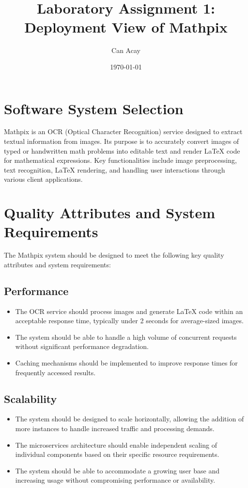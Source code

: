 \documentclass{article}
\title{Laboratory Assignment 1: Deployment View of Mathpix}
\author{Can Acay}
\date{\today}
\begin{document}
\maketitle
\newpage

\tableofcontents
\newpage

\section{Software System Selection}
Mathpix is an OCR (Optical Character Recognition) service designed to extract textual information from images. Its purpose is to accurately convert images of typed or handwritten math problems into editable text and render LaTeX code for mathematical expressions. Key functionalities include image preprocessing, text recognition, LaTeX rendering, and handling user interactions through various client applications.

\section{Quality Attributes and System Requirements}
The Mathpix system should be designed to meet the following key quality attributes and system requirements:

\subsection{Performance}
\begin{itemize}
\item The OCR service should process images and generate LaTeX code within an acceptable response time, typically under 2 seconds for average-sized images.
\item The system should be able to handle a high volume of concurrent requests without significant performance degradation.
\item Caching mechanisms should be implemented to improve response times for frequently accessed results.
\end{itemize}

\subsection{Scalability}
\begin{itemize}
\item The system should be designed to scale horizontally, allowing the addition of more instances to handle increased traffic and processing demands.
\item The microservices architecture should enable independent scaling of individual components based on their specific resource requirements.
\item The system should be able to accommodate a growing user base and increasing usage without compromising performance or availability.
\end{itemize}
\end{document}
